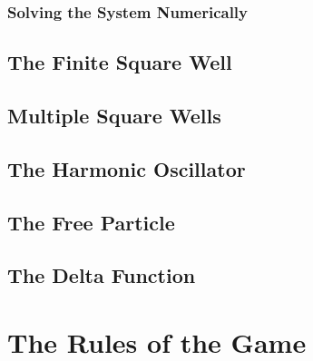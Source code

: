 \documentclass[12pt,letterpaper]{book}
\begin{document}
\subsection*{Solving the System Numerically}




\section{The Finite Square Well}


\section{Multiple Square Wells}



\section{The Harmonic Oscillator}



\section{The Free Particle}



\section{The Delta Function}





\chapter{The Rules of the Game}



\end{document}
